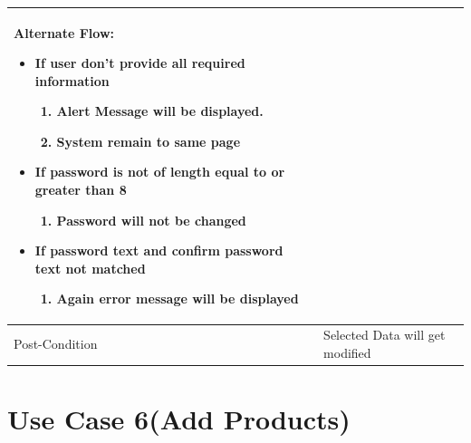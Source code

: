 \documentclass[12pt,a4paper]{report}
\begin{document}
\begin{tabular}{ | m{3cm} | m{12cm}| }
Alternate Flow:

\begin{itemize}
\item	If user don’t provide all required information
	\begin{enumerate}
		\item Alert Message will be displayed.
		\item System remain to same page
	\end{enumerate}
\item If password is not of length equal to or greater than 8
	\begin{enumerate}
	   	 \item	Password will not be changed
	\end{enumerate}
\item If password text and confirm password text not matched
	\begin{enumerate}
		\item Again error message will be displayed
	\end{enumerate}
\end{itemize}
\\ \hline
Post-Condition &   Selected Data will get modified \\ \hline

\end{tabular}

\section{Use Case 6(Add Products) }
\end{document}

